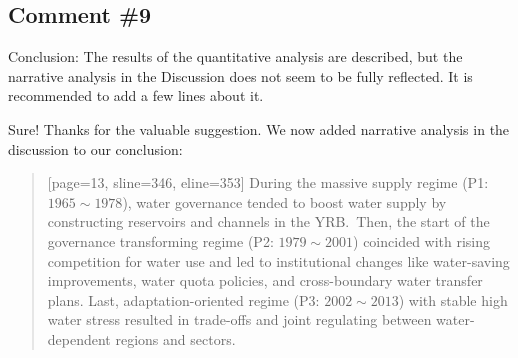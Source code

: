 \subsection{Comment \#9}
\RC{} Conclusion: The results of the quantitative analysis are described, but the narrative analysis in the Discussion does not seem to be fully reflected. It is recommended to add a few lines about it.

\AR{} Sure! Thanks for the valuable suggestion. We now added narrative analysis in the discussion to our conclusion:

\begin{quote}[page=13, sline=346, eline=353]
    During the massive supply regime (P1: $1965 \sim 1978$), water governance tended to boost water supply by constructing reservoirs and channels in the YRB.\
    Then, the start of the governance transforming regime (P2: $1979 \sim 2001$) coincided with rising competition for water use and led to institutional changes like water-saving improvements, water quota policies, and cross-boundary water transfer plans.
    Last, adaptation-oriented regime (P3: $2002 \sim 2013$) with stable high water stress resulted in trade-offs and joint regulating between water-dependent regions and sectors.
\end{quote}
